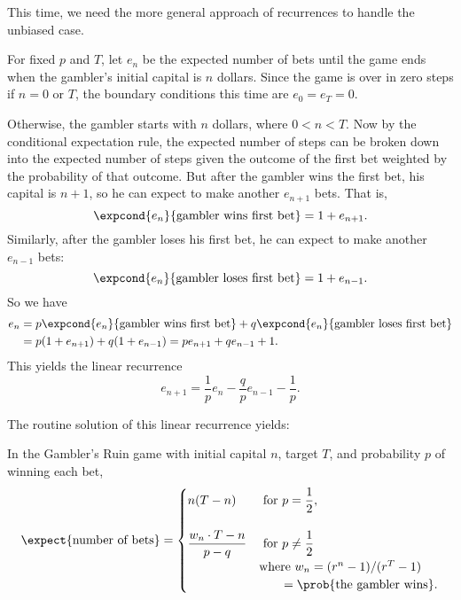 This time, we need the more general approach of recurrences to handle the
unbiased case.  
\fi

For fixed $p$ and $T$, let $e_n$ be the expected number of bets until
the game ends when the gambler's initial capital is $n$ dollars.
Since the game is over in zero steps if $n=0$ or $T$, the boundary
conditions this time are $e_0=e_T=0$.

Otherwise, the gambler starts with $n$ dollars, where $0 < n < T$.
Now by the conditional expectation rule, the expected number of steps
can be broken down into the expected number of steps given the outcome
of the first bet weighted by the probability of that outcome.  But
after the gambler wins the first bet, his capital is $n+1$, so he can
expect to make another $e_{n+1}$ bets.
That is,
\[
\expcond{e_n}{\text{gambler wins first bet}} = 1 + e_{n+1}.
\]
Similarly, after the gambler loses his first bet, he can expect to
make another $e_{n-1}$ bets:
\[
\expcond{e_n}{\text{gambler loses first bet}} = 1 + e_{n-1}.
\]
So we have
\begin{align*}
e_n & = p\expcond{e_n}{\text{gambler wins first bet}} +
      q\expcond{e_n}{\text{gambler loses first bet}}\\
    & = p(1 + e_{n+1}) +  q(1 + e_{n-1}) =  pe_{n+1} + qe_{n-1} + 1.
\end{align*}
This yields the linear recurrence
\begin{equation}\label{expected-bets-recurrence}
e_{n+1} = \frac{1}{p} e_n - \frac{q}{p} e_{n-1} - \frac{1}{p}.
\end{equation}
\iffalse
For $p = q = 1/2$, this simplifies to
\begin{equation}\label{expected-fair-bets-recurrence}
e_{n+1} = 2e_n - e_{n-1} - 2.
\end{equation}

\fi

The routine solution of this linear recurrence yields:
\begin{theorem}\label{ExQthm}
In the Gambler's Ruin game with initial capital $n$, target
$T$, and probability $p$ of winning each bet,
\begin{equation}\label{expectedbets}
\expect{\text{number of bets}} =
 \begin{cases}
 n(T-n) & \text{ for } p = \dfrac{1}{2},\\
          \\ 
\dfrac{w_n  \cdot T - n}{p-q} %
       & \text{ for } p \neq \dfrac{1}{2}\\
       & \text{where } w_n = (r^n - 1)/(r^T - 1)\\
       & \qquad = \prob{\text{the gambler wins}}.
\end{cases}
\end{equation}
\end{theorem}

